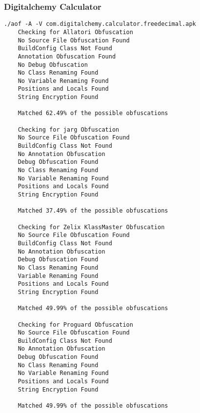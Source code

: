 \subsubsection{Digitalchemy Calculator \cite{calculator}}
\label{app:dcalc}
\begin{lstlisting}
./aof -A -V com.digitalchemy.calculator.freedecimal.apk
    Checking for Allatori Obfuscation
	No Source File Obfuscation Found
	BuildConfig Class Not Found
	Annotation Obfuscation Found
	No Debug Obfuscation
	No Class Renaming Found
	No Variable Renaming Found
	Positions and Locals Found
	String Encryption Found

	Matched 62.49% of the possible obfuscations

    Checking for jarg Obfuscation
	No Source File Obfuscation Found
	BuildConfig Class Not Found
	No Annotation Obfuscation
	Debug Obfuscation Found
	No Class Renaming Found
	No Variable Renaming Found
	Positions and Locals Found
	String Encryption Found

	Matched 37.49% of the possible obfuscations

    Checking for Zelix KlassMaster Obfuscation
	No Source File Obfuscation Found
	BuildConfig Class Not Found
	No Annotation Obfuscation
	Debug Obfuscation Found
	No Class Renaming Found
	Variable Renaming Found
	Positions and Locals Found
	String Encryption Found

	Matched 49.99% of the possible obfuscations

    Checking for Proguard Obfuscation
	No Source File Obfuscation Found
	BuildConfig Class Not Found
	No Annotation Obfuscation
	Debug Obfuscation Found
	No Class Renaming Found
	No Variable Renaming Found
	Positions and Locals Found
	String Encryption Found

	Matched 49.99% of the possible obfuscations
\end{lstlisting}
\newpage
